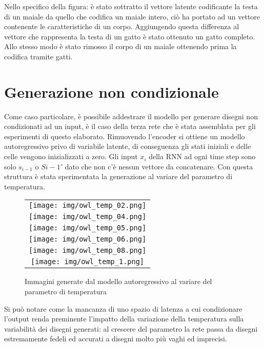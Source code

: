 Nello specifico della figura: è stato sottratto il vettore latente codificante la testa di un maiale da quello che codifica un maiale intero, ciò ha portato ad un vettore contenente le caratteristiche di un corpo. Aggiungendo questa differenza al vettore che rappresenta la testa di un gatto è stato ottenuto un gatto completo. Allo stesso modo è stato rimosso il corpo di un maiale ottenendo prima la codifica tramite gatti.
\section{Generazione non condizionale} %
\label{sec:generazione_non_condizionale}
Come caso particolare, è possibile addestrare il modello per generare disegni non condizionati ad un input, è il caso della terza rete che è stata assemblata per gli esperimenti di questo elaborato. Rimuovendo l'encoder si ottiene un modello autoregressivo privo di variabile latente, di conseguenza gli stati iniziali e delle celle vengono inizializzati a zero. Gli input $x_i$ della RNN ad ogni time step sono solo $s_{i-1}$ o $S{i-1}'$ dato che non c'è nessun vettore da concatenare. Con questa struttura è stata sperimentata la generazione al variare del parametro di temperatura.
\begin{figure}[ht]
	\centering
	\begin{tabular}{c}
		\texttt{[image: img/owl\_temp\_02.png]} \\
		\texttt{[image: img/owl\_temp\_04.png]} \\
		\texttt{[image: img/owl\_temp\_05.png]} \\
		\texttt{[image: img/owl\_temp\_06.png]} \\
		\texttt{[image: img/owl\_temp\_08.png]} \\
		\texttt{[image: img/owl\_temp\_1.png]}
	\end{tabular}
	\caption{Immagini generate dal modello autoregressivo al variare del parametro di temperatura}
\end{figure}

Si può notare come la mancanza di uno spazio di latenza a cui condizionare l'output renda preminente l'impatto della variazione della temperatura sulla variabilità dei disegni generati: al crescere del parametro la rete passa da disegni estremamente fedeli ed accurati a disegni molto più vaghi ed imprecisi.

